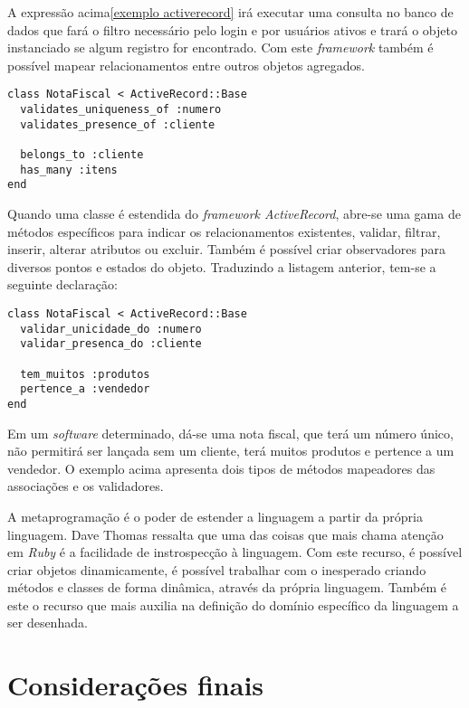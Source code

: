 \documentclass[espaco=simples,appendix=Name]{abnt}
\begin{document}
A expressão acima\ref{exemplo activerecord} irá executar uma consulta no banco de dados que fará o filtro necessário pelo login e por usuários ativos e trará o objeto instanciado se algum registro for encontrado. 
Com este \textit{framework} também é possível mapear relacionamentos entre outros objetos agregados.

\begin{lstlisting}[label=exemplo classe extendida activerecord, caption=Exemplo de classe extendida do ActiveRecord]
class NotaFiscal < ActiveRecord::Base
  validates_uniqueness_of :numero
  validates_presence_of :cliente

  belongs_to :cliente
  has_many :itens
end
\end{lstlisting}

Quando uma classe é estendida do \textit{framework ActiveRecord}, abre-se uma gama de métodos específicos para indicar os relacionamentos existentes, validar, filtrar, inserir, alterar atributos ou excluir. Também é possível criar observadores para diversos pontos e estados do objeto. Traduzindo a listagem anterior, tem-se a seguinte declaração:

\begin{lstlisting}[label=exemplo classe extendida activerecord traduzido, caption=Exemplo de classe do ActiveRecord traduzida]
class NotaFiscal < ActiveRecord::Base
  validar_unicidade_do :numero
  validar_presenca_do :cliente

  tem_muitos :produtos
  pertence_a :vendedor
end
\end{lstlisting}

Em um \textit{software} determinado, dá-se uma nota fiscal, que terá um número único, não permitirá ser lançada sem um cliente, terá muitos produtos e pertence a um vendedor. O exemplo acima apresenta dois tipos de métodos mapeadores das associações e os validadores.

A metaprogramação é o poder de estender a linguagem a partir da própria linguagem. Dave Thomas\cite{programmingRuby} ressalta que uma das coisas que mais chama atenção em \textit{Ruby} é a facilidade de instrospecção à linguagem. Com este recurso, é possível criar objetos dinamicamente, é possível trabalhar com o inesperado criando métodos e classes de forma dinâmica, através da própria linguagem. Também é este o recurso que mais auxilia na definição do domínio específico da linguagem a ser desenhada. 


\chapter {Considerações finais}
\end{document}

